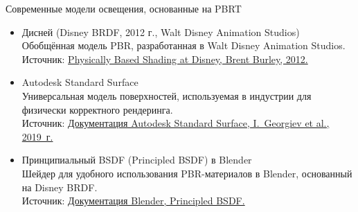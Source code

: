 \documentclass{beamer}
\begin{document}
	\begin{frame}{
		Современные модели освещения, основанные на PBRT
		}

		\begin{itemize}
			\item 
			Дисней (Disney BRDF, 2012 г., Walt Disney Animation Studios)\\
			Обобщённая модель PBR, разработанная в Walt Disney Animation Studios.\\
			{Источник:} \href{https://media.disneyanimation.com/uploads/production/publication_asset/48/asset/s2012_pbs_disney_brdf_notes_v3.pdf}{Physically Based Shading at Disney, Brent Burley, 2012.}
	
			\item 
			Autodesk Standard Surface\\
			Универсальная модель поверхностей, используемая в индустрии для физически корректного рендеринга.\\
			{Источник:} \href{https://autodesk.github.io/standard-surface/}{Документация Autodesk Standard Surface, I.~Georgiev et al., 2019~г.}
	
			\item 
			Принципиальный BSDF (Principled BSDF) в Blender\\
			Шейдер для удобного использования PBR-материалов в Blender, основанный на Disney BRDF.\\
			{Источник:} \href{https://docs.blender.org/manual/ru/4.3/render/shader_nodes/shader/principled.html}{Документация Blender, Principled BSDF.}
	\end{itemize}


	\end{frame}
\end{document}
